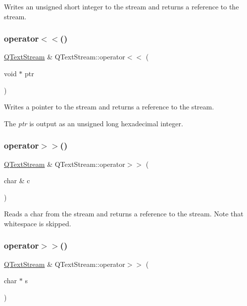 Writes an {\ttfamily unsigned} {\ttfamily short} integer to the stream and returns a reference to the stream. \mbox{\label{class_q_text_stream_a2ec702def0e5ee2c6167cc7accfb8119}} 
\subsubsection{\texorpdfstring{operator$<$$<$()}{operator<<()}\hspace{0.1cm}{\footnotesize\ttfamily [14/14]}}
{\footnotesize\ttfamily \mbox{\hyperlink{class_q_text_stream}{Q\+Text\+Stream}} \& Q\+Text\+Stream\+::operator$<$$<$ (\begin{DoxyParamCaption}\item[{void $\ast$}]{ptr }\end{DoxyParamCaption})}

Writes a pointer to the stream and returns a reference to the stream.

The {\itshape ptr} is output as an unsigned long hexadecimal integer. \mbox{\label{class_q_text_stream_a71c417d8225d836e27b1854751f5ff5a}} 
\subsubsection{\texorpdfstring{operator$>$$>$()}{operator>>()}\hspace{0.1cm}{\footnotesize\ttfamily [1/13]}}
{\footnotesize\ttfamily \mbox{\hyperlink{class_q_text_stream}{Q\+Text\+Stream}} \& Q\+Text\+Stream\+::operator$>$$>$ (\begin{DoxyParamCaption}\item[{char \&}]{c }\end{DoxyParamCaption})}

Reads a {\ttfamily char} from the stream and returns a reference to the stream. Note that whitespace is skipped. \mbox{\label{class_q_text_stream_a52cffa4947a97d83d13aae06575820f4}} 
\subsubsection{\texorpdfstring{operator$>$$>$()}{operator>>()}\hspace{0.1cm}{\footnotesize\ttfamily [2/13]}}
{\footnotesize\ttfamily \mbox{\hyperlink{class_q_text_stream}{Q\+Text\+Stream}} \& Q\+Text\+Stream\+::operator$>$$>$ (\begin{DoxyParamCaption}\item[{char $\ast$}]{s }\end{DoxyParamCaption})}

